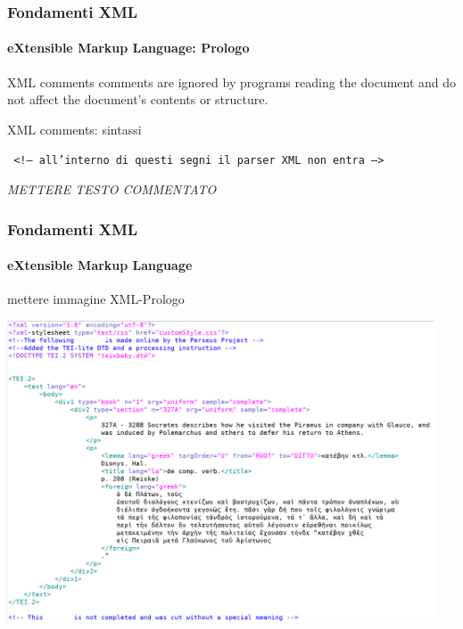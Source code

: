 \begin{frame}
	\frametitle{Fondamenti XML}
	\framesubtitle{eXtensible Markup Language: Prologo}
	\addtocounter{nframe}{1}

	\begin{block}{XML comments}
		comments are ignored by programs reading the document and
		do not affect the document's contents or structure.
	\end{block}

	\begin{block}{XML comments: sintassi}
	\begin{center}\texttt{
		<!-- all'interno di questi segni il parser XML non entra -->
	}\end{center}
	\end{block}

	\textit{METTERE TESTO COMMENTATO}

\end{frame}

\begin{frame}
	\frametitle{Fondamenti XML}
	\framesubtitle{eXtensible Markup Language}
	\addtocounter{nframe}{1}

	\begin{center}
		mettere immagine XML-Prologo

		\includegraphics[width=0.95\textwidth]{imgs/xml-TEI-PerseusExample.png}
	\end{center}

\end{frame}

